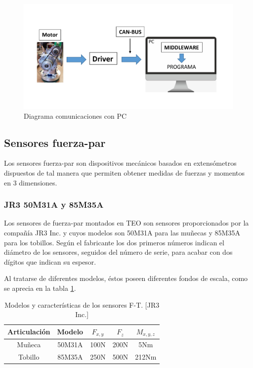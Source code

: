\begin{figure}[H]
\centering
\includegraphics[scale=0.6]{imagenes/apartado_3/33_diagrama_comunicaciones}
\caption{Diagrama comunicaciones con PC}
\label{figura33}
\end{figure}

\subsection{Sensores fuerza-par}

Los sensores fuerza-par son dispositivos mecánicos basados en extensómetros dispuestos de tal manera que permiten obtener medidas de fuerzas y momentos en 3 dimensiones.

\subsubsection{JR3 50M31A y 85M35A}
Los sensores de fuerza-par montados en TEO son sensores proporcionados por la compañía JR3 Inc. y cuyos modelos son 50M31A para las muñecas y 85M35A para los tobillos. Según el fabricante los dos primeros números indican el diámetro de los sensores, seguidos del número de serie, para acabar con dos dígitos que indican su espesor.

Al tratarse de diferentes modelos, éstos poseen diferentes fondos de escala, como se aprecia en la tabla \ref{tabla31}.

\begin{table}[H]
\begin{center}
    \begin{tabular}{| c | c | c | c | c |}
    \hline
    \rowcolor[gray]{0.7} Articulación & Modelo & $F_{x,y}$ & $F_{z}$ & $M_{x,y,z}$ \\ \hline
    \cellcolor[gray]{0.9}Muñeca & 50M31A & 100N & 200N & 5Nm \\ \hline
    \cellcolor[gray]{0.9}Tobillo & 85M35A & 250N & 500N & 212Nm\\ \hline
    \end{tabular}
\end{center}
\caption{Modelos y características de los sensores F-T. [JR3 Inc.]}
\label{tabla31}
\end{table}

